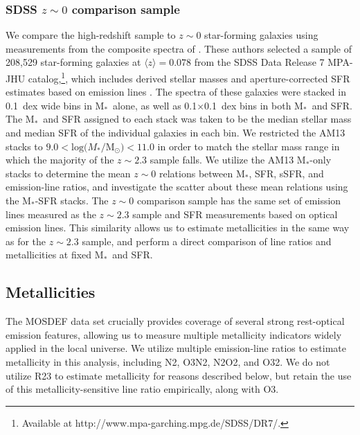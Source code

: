 \documentclass[iop,twocolappendix]{emulateapj}
\newcommand{\mstar}{$\mbox{M}_*$}
\begin{document}
\subsubsection{SDSS $z\sim0$ comparison sample}

We compare the high-redshift sample to $z\sim0$ star-forming galaxies using measurements from the composite spectra
 of \citet[][hereafter AM13]{and13}.
  These authors selected a sample of 208,529 star-forming galaxies at $\langle z\rangle=0.078$ from the SDSS \citep{yor00}
 Data Release 7 \citep{aba09} MPA-JHU catalog,\footnote[11]{Available at http://www.mpa-garching.mpg.de/SDSS/DR7/.},
 which includes derived stellar masses \citep{kau03} and aperture-corrected SFR estimates based on
 emission lines \citep{bri04,sal07}.  The spectra of these galaxies were stacked
 in 0.1~dex wide bins in \mstar\ alone, as well as 0.1$\times$0.1~dex bins in both \mstar\ and SFR.
  The \mstar\ and SFR assigned to each stack was taken to be the median stellar
 mass and median SFR of the individual galaxies in each bin.
  We restricted the AM13 stacks to $9.0<\text{log(}M_*/\text{M}_{\odot})<11.0$
 in order to match the stellar mass range in which the majority of the $z\sim2.3$ sample falls.
  We utilize the AM13
 \mstar-only stacks to determine the mean $z\sim0$ relations between \mstar, SFR, sSFR, and
 emission-line ratios, and investigate the scatter about these mean relations using the
 \mstar-SFR stacks.
  The $z\sim0$ comparison sample has the same set of emission lines measured
 as the $z\sim2.3$ sample and SFR measurements based on optical emission lines.
  This similarity allows us to estimate metallicities
 in the same way as for the $z\sim2.3$ sample, and perform a direct comparison of
 line ratios and metallicities at fixed \mstar\ and SFR.

\subsection{Metallicities}\label{sec:metallicities}

The MOSDEF data set crucially provides coverage of several strong rest-optical emission features,
 allowing us to measure multiple metallicity indicators widely applied in the local universe.
  We utilize multiple emission-line ratios to estimate metallicity in this analysis, including
 N2, O3N2, N2O2, and O32.
  We do not utilize R23 to estimate metallicity for reasons described below, but retain the use of this
 metallicity-sensitive line ratio empirically, along with O3.
\end{document}
